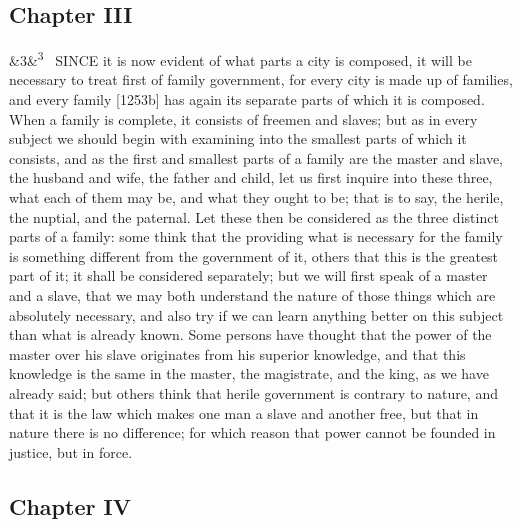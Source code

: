 \documentclass[12pt]{article}
\newcommand{\para}[1][]{\par\noindent\ifx&#1&\else\textsuperscript{\footnotesize #1}~\fi}
\begin{document}
\subsection*{Chapter III}

\para[3] SINCE it is now evident of what parts a city is composed, it will be necessary to treat first of family government, for every city is made up of families, and every family [1253b] has again its separate parts of which it is composed. When a family is complete, it consists of freemen and slaves; but as in every subject we should begin with examining into the smallest parts of which it consists, and as the first and smallest parts of a family are the master and slave, the husband and wife, the father and child, let us first inquire into these three, what each of them may be, and what they ought to be; that is to say, the herile, the nuptial, and the paternal. Let these then be considered as the three distinct parts of a family: some think that the providing what is necessary for the family is something different from the government of it, others that this is the greatest part of it; it shall be considered separately; but we will first speak of a master and a slave, that we may both understand the nature of those things which are absolutely necessary, and also try if we can learn anything better on this subject than what is already known. Some persons have thought that the power of the master over his slave originates from his superior knowledge, and that this knowledge is the same in the master, the magistrate, and the king, as we have already said; but others think that herile government is contrary to nature, and that it is the law which makes one man a slave and another free, but that in nature there is no difference; for which reason that power cannot be founded in justice, but in force.

\subsection*{Chapter IV}
\end{document}
